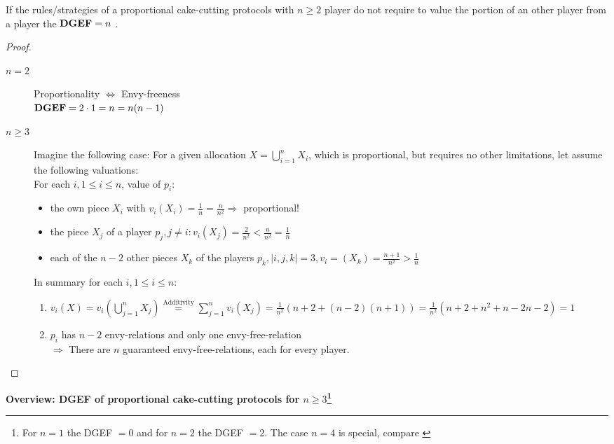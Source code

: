 \begin{satz}
 If the rules/strategies of a proportional cake-cutting protocols with $n\geq2$ player do not require to value the portion of an other player from a player the $\text{\textbf{DGEF}}=n$ .
\end{satz}
\begin{proof}
 \begin{description}
  \item[$n=2$] Proportionality $\Leftrightarrow$ Envy-freeness\\$\text{\textbf{DGEF}}=2 \cdot 1=n=n(n-1)$
  \item[$n\geq3$] Imagine the following case: For a given allocation $X=\bigcup\limits_{i=1}^nX_i$, which is proportional, but requires no other limitations, let assume the following valuations: \\For each $i, 1\leq i\leq n$, value of $p_i$:
                  \begin{itemize}
                   \item the own piece $X_i$ with $v_i(X_i)=\frac{1}{n}=\frac{n}{n^2}\Rightarrow$ proportional!
                   \item the piece $X_j$ of a player $p_j, j\neq i: v_i(X_j)=\frac{2}{n^2}<\frac{n}{n^2}=\frac{1}{n}$
                   \item each of the $n-2$ other pieces $X_k$ of the players $p_k, |{i,j,k}|=3, v_i=(X_k)=\frac{n+1}{n^2}>\frac{1}{n}$
                  \end{itemize}
                  In summary for each $i, 1\leq i\leq n$:
                  \begin{enumerate}
                   \item $v_i(X)=v_i(\bigcup\limits_{j=1}^nX_j)\stackrel{\text{Additivity}}{=}\sum\limits_{j=1}^nv_i(X_j)=
                         \frac{1}{n^2}(n+2+(n-2)(n+1))=\frac{1}{n^2}(n+2+n^2+n-2n-2)=1$
                   \item $p_i$ has $n-2$ envy-relations and only one envy-free-relation\\$\Rightarrow$ There are $n$ guaranteed envy-free-relations, each for every player.
                  \end{enumerate}
 \end{description}
\end{proof}
\textbf{Overview: DGEF of proportional cake-cutting protocols for $n \geq 3$\footnote{For $n=1$ the DGEF $=0$ and for $n=2$ the DGEF $=2$. The case $n=4$ is special, compare \cite{lindner:degrees}}}\\
